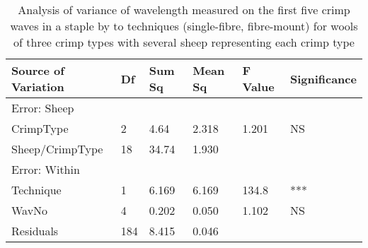 %

\begin{table}[htp]
\centering
\caption{Analysis of variance of wavelength measured on the first five crimp waves in a staple by to techniques (single-fibre, fibre-mount) for wools of three crimp types with several sheep representing each crimp type}
\label{tab:wavl5}
\vspace{0.1in}
\begin{tabular}{|p{1.3in}|p{0.4in}|p{0.4in}|p{0.4in}|p{0.4in}|p{0.8in}|} \hline
     Source of Variation & Df & Sum Sq  & Mean Sq  & F Value  & Significance  \\  \hline
 Error: Sheep & & & & & \\
 CrimpType & 2 & 4.64 & 2.318 & 1.201 & NS  \\
 Sheep/CrimpType & 18 & 34.74 & 1.930 &  &  \\ 
 Error: Within & & & & & \\
 Technique & 1 & 6.169 & 6.169 & 134.8  & ***  \\
 WavNo & 4 & 0.202 & 0.050 & 1.102 & NS \\
 Residuals & 184 & 8.415 & 0.046 & & \\ \hline
\end{tabular}
\end{table}

%
